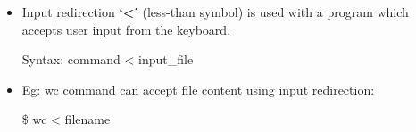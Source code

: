 \setlength{\columnsep}{3pt}
\begin{flushleft}
	\begin{itemize}
		\item Input redirection \textbf{‘<’} (less-than symbol) is used with a program which accepts user input from the keyboard. 
		\bigskip
		\begin{tcolorbox}[breakable,notitle,boxrule=-0pt,colback=pink,colframe=pink]
			\color{black}
			\font=9pt
			Syntax: command < input\_file
			\font=4pt
		\end{tcolorbox}
		\item
		Eg: wc command can accept file content using input redirection:
		\bigskip
		\begin{tcolorbox}[breakable,notitle,boxrule=-0pt,colback=black,colframe=black]
			\color{green}
			\font=9pt
			\$ wc < filename
			\font=4pt
		\end{tcolorbox}
	\end{itemize}
	


	
\end{flushleft}
